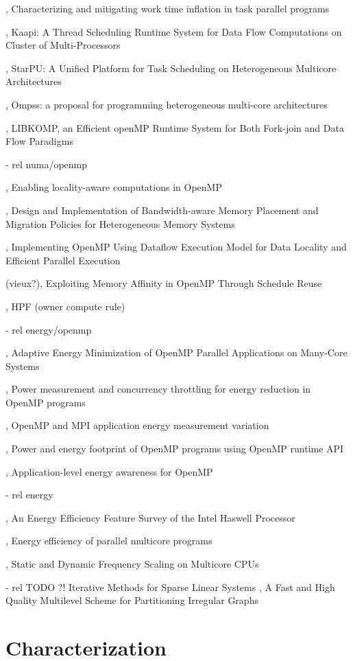 \cite{Olivier2013}, Characterizing and mitigating work time inflation in task parallel programs

\cite{Gautier2007}, Kaapi: A Thread Scheduling Runtime System for Data Flow Computations on Cluster of Multi-Processors

\cite{StarPU}, StarPU: A Unified Platform for Task Scheduling on Heterogeneous Multicore Architectures

\cite{OMPSs}, Ompss: a proposal for programming heterogeneous multi-core architectures

\cite{Broquedis2012}, LIBKOMP, an Efficient openMP Runtime System for Both Fork-join and Data Flow Paradigms

  - rel numa/openmp

\cite{Huang2010}, Enabling locality-aware computations in OpenMP

\cite{Yu2017}, Design and Implementation of Bandwidth-aware Memory Placement and Migration Policies for Heterogeneous Memory Systems

\cite{Weng2002}, Implementing OpenMP Using Dataflow Execution Model for Data Locality and Efficient Parallel Execution

(vieux?)\cite{Nikolopoulos2001}, Exploiting Memory Affinity in OpenMP Through Schedule Reuse

\cite{HPF}, HPF (owner compute rule)

  - rel energy/openmp

\cite{Shafik2015}, Adaptive Energy Minimization of OpenMP Parallel Applications on Many-Core Systems

\cite{Porterfield2013}, Power measurement and concurrency throttling for energy reduction in OpenMP programs

\cite{Porterfield2013a}, OpenMP and MPI application energy measurement variation

\cite{Nandamuri2015}, Power and energy footprint of OpenMP programs using OpenMP runtime API

\cite{Alessi2015}, Application-level energy awareness for OpenMP

  - rel energy

\cite{Hackenberg2015}, An Energy Efficiency Feature Survey of the Intel Haswell Processor

\cite{Davidovic2015}, Energy efficiency of parallel multicore programs

\cite{Bao2016}, Static and Dynamic Frequency Scaling on Multicore CPUs

 - rel TODO ?!
\cite{Saad2013} Iterative Methods for Sparse Linear Systems
\cite{Karypis1998}, A Fast and High Quality Multilevel Scheme for Partitioning Irregular Graphs

\section{Characterization}



